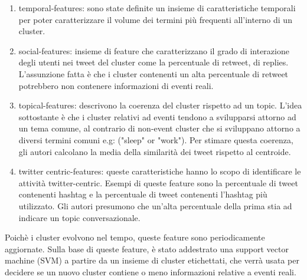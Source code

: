 \begin{enumerate}
\item temporal-features: sono state definite un insieme di caratteristiche temporali per poter caratterizzare il volume dei termini più frequenti all'interno di un cluster.
\item social-features: insieme di feature che caratterizzano il grado di interazione degli utenti nei tweet del cluster come la percentuale di retweet, di replies. L'assunzione fatta è che i cluster contenenti un alta percentuale di retweet potrebbero non contenere informazioni di eventi reali.
\item topical-features: descrivono la coerenza del cluster rispetto ad un topic. L'idea sottostante è che i cluster relativi ad eventi tendono a svilupparsi attorno ad un tema comune, al contrario di non-event cluster che si sviluppano attorno a diversi termini comuni e.g: ("sleep" or "work"). Per stimare questa coerenza, gli autori calcolano la media della similarità dei tweet rispetto al centroide.
\item twitter centric-features: queste caratteristiche hanno lo scopo di identificare le attività twitter-centric. Esempi di queste feature sono la percentuale di tweet contenenti hashtag e la percentuale di tweet contenenti l'hashtag più utilizzato. Gli autori presumono che un'alta percentuale della prima stia ad indicare un topic conversazionale.
\end{enumerate}
Poichè i cluster evolvono nel tempo, queste feature sono periodicamente aggiornate.
Sulla base di queste feature, è stato addestrato una support vector machine (SVM) a partire da un insieme di cluster etichettati, che verrà usata per decidere se un nuovo cluster contiene o meno informazioni relative a eventi reali. 

